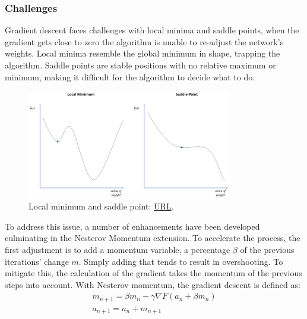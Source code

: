 \subsubsection{Challenges}
Gradient descent faces challenges with local minima and saddle points, when the gradient gets close to zero the algorithm is unable to re-adjust the network's weights. Local minima resemble the global minimum in shape, trapping the algorithm. Saddle points are stable positions with no relative maximum or minimum, making it difficult for the algorithm to decide what to do.
\begin{figure}[H]
    \centering
        \includegraphics[width=0.8\textwidth]{Images/diagrams/LocalMinimum_SaddlePoints.png}
        \decoRule
        \caption[Local minimum and saddle point]{Local minimum and saddle point: \href{https://www.ibm.com/cloud/learn/gradient-descent}{URL}.}
        \label{fig:Local minimum and saddle point}
\end{figure}

To address this issue, a number of enhancements have been developed culminating in the Nesterov Momentum\cite{nesterov_momentum} extension. To accelerate the process, the first adjustment is to add a momentum variable, a percentage \(\beta\) of the previous iterations' change \(m\). Simply adding that tends to result in overshooting. To mitigate this, the calculation of the gradient takes the momentum of the previous steps into account. With Nesterov momentum, the gradient descent is defined as:
\begin{equation}
    \begin{gathered} 
        m_{n+1} = \beta m_n - \gamma \nabla F \left( a_n + \beta m_n \right)\\
        a_{n+1} = a_n + m_{n+1}\\
    \end{gathered}
	\label{eqn:Gradient Descent with Nesterov momentum}
\end{equation}

